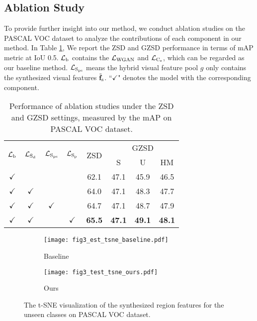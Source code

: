 \documentclass[10pt,twocolumn,letterpaper]{article}
\begin{document}
\subsection{Ablation Study}
\label{ablation_study}
To provide further insight into our method, we conduct ablation studies on the PASCAL VOC dataset to analyze the contributions of each component in our method. In Table \ref{ablation}, We report the ZSD and GZSD performance in terms of mAP metric at IoU 0.5. $\mathcal{L}_{\rm b}$ contains the $\mathcal{L}_{\rm WGAN}$ and $\mathcal{L}_{\rm C_s}$, which can be regarded as our baseline method. $\mathcal{L}_{\rm S_{ps}}$ means the hybrid visual feature pool $g$ only contains the synthesized visual features $\tilde{\mathbf{f}}_{\rm s}$. ``$\checkmark$" denotes the model with the corresponding component.

\begin{table}[t]
  \centering

  \caption{Performance of ablation studies under the ZSD and GZSD settings, measured by the mAP on PASCAL VOC dataset.}
\renewcommand\tabcolsep{5.7pt}
    \begin{tabular}{cccccccc}
    \toprule
    \multirow{2}[4]{*}{$\mathcal{L}_{\rm b}$} & \multirow{2}[4]{*}{$\mathcal{L}_{\rm S_d}$} & \multirow{2}[4]{*}{$\mathcal{L}_{\rm S_{ps}}$} & \multirow{2}[4]{*}{$\mathcal{L}_{\rm S_p}$} & \multirow{2}[4]{*}{ZSD} & \multicolumn{3}{c}{GZSD} \\
\cmidrule{6-8}          &       &       &       &       & S     & U     & HM \\
    \midrule
    $\checkmark$     &       &       &       & 62.1     &47.1     &45.9      & 46.5  \\
    $\checkmark$     & $\checkmark$     &       &       &64.0       &47.1       &48.3       & 47.7 \\
    $\checkmark$     & $\checkmark$     & $\checkmark$     &       &64.7       &47.1       &48.7       &47.9  \\
    $\checkmark$     & $\checkmark$     &      & $\checkmark$  &\textbf{65.5}     & \textbf{47.1}      & \textbf{49.1}      & \textbf{48.1} \\
    \bottomrule
    \end{tabular}\label{ablation}\end{table}\begin{figure}
  \centering
\begin{subfigure}{0.48\linewidth}
    \texttt{[image: fig3\_est\_tsne\_baseline.pdf]}
    \caption{Baseline} \label{seen}
  \end{subfigure}
  \hfill
  \begin{subfigure}{0.48\linewidth}
    \texttt{[image: fig3\_test\_tsne\_ours.pdf]}
    \caption{Ours}
    \label{unseen}
  \end{subfigure}
  \caption{The t-SNE \cite{van2008visualizing} visualization of the synthesized region features for the unseen classes on PASCAL VOC dataset.}
  \label{fig:short}
\label{tsne}
\vspace{-3.0mm}
\end{figure}
\end{document}
